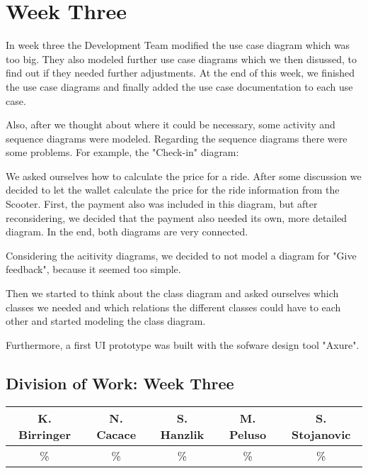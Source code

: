 \documentclass[a4paper, 12pt]{article}
\begin{document}
\section{Week Three}
In week three the Development Team modified the use case diagram which was too big. They also modeled further use case diagrams which we then disussed, to find out if they needed further adjustments. At the end of this week, we finished the use case diagrams and finally added the use case documentation to each use case.

Also, after we thought about where it could be necessary, some activity and sequence diagrams were modeled.
Regarding the sequence diagrams there were some problems.
For example, the "Check-in" diagram:

We asked ourselves how to calculate the price for a ride. After some discussion we decided to let the wallet calculate the price for the ride information from the Scooter.
First, the payment also was included in this diagram, but after reconsidering, we decided that the payment also needed its own, more detailed diagram. In the end, both diagrams are very connected.

Considering the acitivity diagrams, we decided to not model a diagram for "Give feedback", because it seemed too simple.

Then we started to think about the class diagram and asked ourselves which classes we needed and which relations the different classes could have to each other and started modeling the class diagram.

Furthermore, a first UI prototype was built with the sofware design tool "Axure".\cite{axure}

\newpage
\subsection{Division of Work: Week Three}

\begin{table}[h]
\centering
\setlength{\tabcolsep}{10pt}
\begin{tabular}{|c|c|c|c|c|}
\hline
K. Birringer & N. Cacace & S. Hanzlik & M. Peluso & S. Stojanovic\\
\hline
\% & \% & \% & \% & \% \\ 
\hline
\end{tabular}
\end{table}

\end{document}

